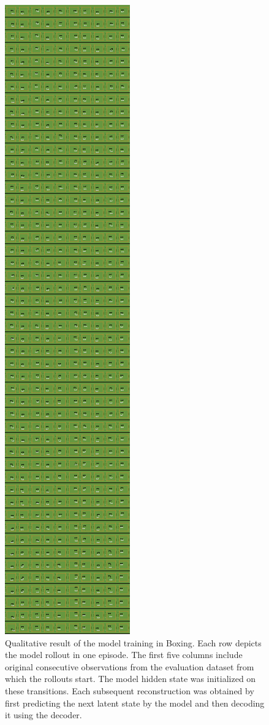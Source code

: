 \begin{figure}[H]
\includegraphics[height=0.9\textheight,keepaspectratio]{figures/PlaNet/Boxing_memory_sharp.png}
\caption[Qualitative result of the PlaNet model training with a lower divergence scale in Boxing]{Qualitative result of the model training in Boxing. Each row depicts the model rollout in one episode. The first five columns include original consecutive observations from the evaluation dataset from which the rollouts start. The model hidden state was initialized on these transitions. Each subsequent reconstruction was obtained by first predicting the next latent state by the model and then decoding it using the decoder.}
\label{Fig.PlaNet_Boxing_lower_divergence_scale}
\end{figure}

